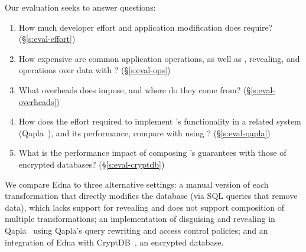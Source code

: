 Our evaluation seeks to answer  questions:
%
\begin{enumerate}[nosep]
 \item How much developer effort and application modification does \sys require? (\S\ref{s:eval-effort})
%
\item How expensive are common application operations, as well as
  \xxing, revealing, and operations over \xxed data with \sys? (\S\ref{s:eval-ops})
%
\item What overheads does \sys impose, and where do they come from?
    (\S\ref{s:eval-overheads})

\item 
    How does the effort required to implement \sys's
    functionality in a related system (Qapla~\cite{qapla}),
    and its performance, compare with using \sys?
    (\S\ref{s:eval-qapla})

\item 
    What is the performance impact of composing \sys's guarantees
    with those of encrypted databases?
        (\S\ref{s:eval-cryptdb})
%
\end{enumerate}

%

We compare Edna to three alternative settings:
\one{} a manual version
of each \xxing transformation that directly modifies the database
(\eg via SQL queries that remove data), which
lacks support for revealing and does not support
composition of multiple transformations;
\two{} an implementation of disguising and revealing in Qapla~\cite{qapla}
using Qapla’s query rewriting and access control policies; and \three{} an integration of Edna with CryptDB~\cite{cryptdb}, an encrypted database.

%

